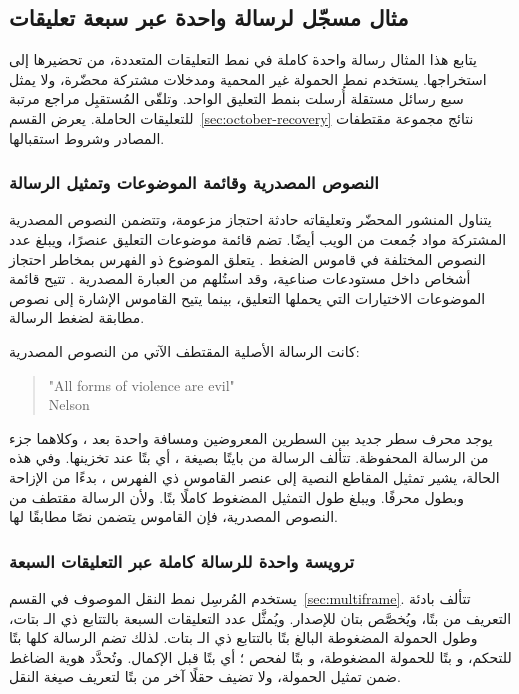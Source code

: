 \subsection{مثال مسجّل لرسالة واحدة عبر سبعة تعليقات}
\label{sec:multicomment-example}

يتابع هذا المثال رسالة واحدة كاملة في نمط التعليقات المتعددة، من تحضيرها إلى استخراجها. يستخدم نمط الحمولة غير المحمية ومدخلات مشتركة محضّرة، ولا يمثل سبع رسائل مستقلة أُرسلت بنمط التعليق الواحد. وتلقّى المُستقبِل مراجع مرتبة للتعليقات الحاملة. يعرض القسم~\ref{sec:october-recovery} نتائج مجموعة مقتطفات المصادر وشروط استقبالها.

\subsubsection{النصوص المصدرية وقائمة الموضوعات وتمثيل الرسالة}
يتناول المنشور المحضّر وتعليقاته حادثة احتجاز مزعومة، وتتضمن النصوص المصدرية المشتركة مواد جُمعت من الويب أيضًا. تضم قائمة موضوعات التعليق \NUM{\McTopicChoices} عنصرًا، ويبلغ عدد النصوص المختلفة في قاموس الضغط \NUM{\McDictionaryEntries}. يتعلق الموضوع ذو الفهرس \NUM{\McTopicIndex} بمخاطر احتجاز أشخاص داخل مستودعات صناعية، وقد استُلهم من العبارة المصدرية . تتيح قائمة الموضوعات الاختيارات التي يحملها التعليق، بينما يتيح القاموس الإشارة إلى نصوص مطابقة لضغط الرسالة.

كانت الرسالة الأصلية المقتطف الآتي من النصوص المصدرية:
\begin{quote}
\begin{english}
\ttfamily
"All forms of violence are evil"\\
Nelson
\end{english}
\end{quote}
يوجد محرف سطر جديد بين السطرين المعروضين ومسافة واحدة بعد ، وكلاهما جزء من الرسالة المحفوظة. تتألف الرسالة من \NUM{\McPayloadBytes} بايتًا بصيغة ، أي \NUM{\McPayloadStorageBits} بتًا عند تخزينها. وفي هذه الحالة، يشير تمثيل المقاطع النصية إلى عنصر القاموس ذي الفهرس ، بدءًا من الإزاحة  وبطول  محرفًا. ويبلغ طول التمثيل المضغوط كاملًا \NUM{\McCompressedBits} بتًا. ولأن الرسالة مقتطف من النصوص المصدرية، فإن القاموس يتضمن نصًا مطابقًا لها.

\subsubsection{ترويسة واحدة للرسالة كاملة عبر التعليقات السبعة}
يستخدم المُرسِل نمط النقل الموصوف في القسم~\ref{sec:multiframe}. تتألف بادئة التعريف من \NUM{\McMarkerBits} بتًا، ويُخصَّص بتان للإصدار. ويُمثَّل عدد التعليقات السبعة بالتتابع \EN{\texttt{\McGammaCount}} ذي الـ\NUM{\McCountBits} بتات، وطول الحمولة المضغوطة البالغ \NUM{\McCompressedBits} بتًا بالتتابع \EN{\texttt{\McGammaLength}} ذي الـ\NUM{\McLengthBits} بتات. لذلك تضم الرسالة كلها \NUM{\McControlBits} بتًا للتحكم، و\NUM{\McCompressedBits} بتًا للحمولة المضغوطة، و\NUM{\McIntegrityBits} بتًا لفحص ؛ أي \NUM{\McStreamBits} بتًا قبل الإكمال. وتُحدَّد هوية الضاغط ضمن تمثيل الحمولة، ولا تضيف حقلًا آخر من  بتًا لتعريف صيغة النقل.

